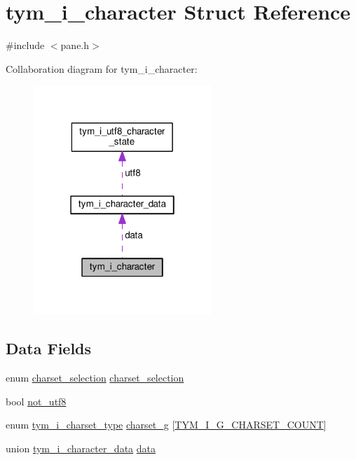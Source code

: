 \hypertarget{structtym__i__character}{}\section{tym\+\_\+i\+\_\+character Struct Reference}
\label{structtym__i__character}


{\ttfamily \#include $<$pane.\+h$>$}



Collaboration diagram for tym\+\_\+i\+\_\+character\+:
\nopagebreak
\begin{figure}[H]
\begin{center}
\leavevmode
\includegraphics[width=190pt]{structtym__i__character__coll__graph}
\end{center}
\end{figure}
\subsection*{Data Fields}
\begin{DoxyCompactItemize}
\item 
enum \hyperlink{charset_8h_ac56946240a6c0621eb2162e6a7e85493}{charset\+\_\+selection} \hyperlink{structtym__i__character_a03e1385411863f05f23f05aa453db5f6}{charset\+\_\+selection}
\item 
bool \hyperlink{structtym__i__character_a4dd1b66f6a453c6b7243d51549b27160}{not\+\_\+utf8}
\item 
enum \hyperlink{charset_8h_aec311a13b718c6327abd094839df7146}{tym\+\_\+i\+\_\+charset\+\_\+type} \hyperlink{structtym__i__character_a6cc0f4a423aacfba65d2b9df6109ac03}{charset\+\_\+g} \mbox{[}\hyperlink{pane_8h_a0411cd49bb5b71852cecd93bcbf0ca2da4d2fa1719aa429e38bbd477d3a38634b}{T\+Y\+M\+\_\+\+I\+\_\+\+G\+\_\+\+C\+H\+A\+R\+S\+E\+T\+\_\+\+C\+O\+U\+NT}\mbox{]}
\item 
union \hyperlink{uniontym__i__character__data}{tym\+\_\+i\+\_\+character\+\_\+data} \hyperlink{structtym__i__character_aa38c672dcb8dba6d8f651132ae2655b3}{data}
\end{DoxyCompactItemize}


